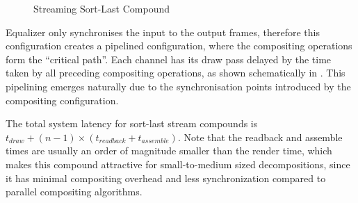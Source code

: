 \begin{figure}[h!t]\center
  \hfil{}
  {\caption{Streaming Sort-Last Compound}}
\end{figure}

Equalizer only synchronises the input to the output frames, therefore this
configuration creates a pipelined configuration, where the compositing
operations form the ``critical path''. Each channel has its draw pass
delayed by the time taken by all preceding compositing operations, as shown
schematically in . This pipelining emerges naturally due to
the synchronisation points introduced by the compositing configuration.

The total system latency for sort-last stream compounds is $t_{draw} + (n -
1)\times (t_{readback} + t_{assemble})$. Note that the readback and assemble
times are usually an order of magnitude smaller than the render time, which
makes this compound attractive for small-to-medium sized decompositions, since
it has minimal compositing overhead and less synchronization compared to
parallel compositing algorithms.

